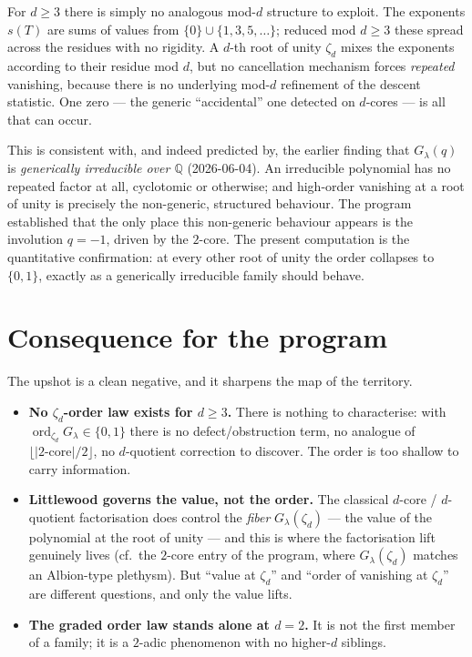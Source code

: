 \documentclass[11pt]{article}
\theoremstyle{definition}
\theoremstyle{remark}
\newcommand{\ord}{\operatorname{ord}}
\newcommand{\Q}{\mathbb{Q}}
\begin{document}
For $d \ge 3$ there is simply no analogous mod-$d$ structure to exploit. The exponents
$s(T)$ are sums of values from $\{0\} \cup \{1,3,5,\dots\}$; reduced mod $d \ge 3$
these spread across the residues with no rigidity. A $d$-th root of unity $\zeta_d$
mixes the exponents according to their residue mod $d$, but no cancellation mechanism
forces \emph{repeated} vanishing, because there is no underlying mod-$d$ refinement of
the descent statistic. One zero --- the generic ``accidental'' one detected on
$d$-cores --- is all that can occur.

This is consistent with, and indeed predicted by, the earlier finding that
$G_\lambda(q)$ is \emph{generically irreducible over $\Q$} (2026-06-04). An
irreducible polynomial has no repeated factor at all, cyclotomic or otherwise; and
high-order vanishing at a root of unity is precisely the non-generic, structured
behaviour. The program established that the only place this non-generic behaviour
appears is the involution $q = -1$, driven by the $2$-core. The present computation is
the quantitative confirmation: at every other root of unity the order collapses to
$\{0,1\}$, exactly as a generically irreducible family should behave.

\section{Consequence for the program}

The upshot is a clean negative, and it sharpens the map of the territory.

\begin{itemize}
\item \textbf{No $\zeta_d$-order law exists for $d \ge 3$.} There is nothing to
characterise: with $\ord_{\zeta_d} G_\lambda \in \{0,1\}$ there is no
defect/obstruction term, no analogue of $\lfloor |2\text{-core}|/2\rfloor$, no
$d$-quotient correction to discover. The order is too shallow to carry information.

\item \textbf{Littlewood governs the value, not the order.} The classical
$d$-core / $d$-quotient factorisation does control the \emph{fiber} $G_\lambda(\zeta_d)$
--- the value of the polynomial at the root of unity --- and this is where the
factorisation lift genuinely lives (cf.\ the $2$-core entry of the program, where
$G_\lambda(\zeta_d)$ matches an Albion-type plethysm). But ``value at $\zeta_d$'' and
``order of vanishing at $\zeta_d$'' are different questions, and only the value lifts.

\item \textbf{The graded order law stands alone at $d=2$.} It is not the first member
of a family; it is a $2$-adic phenomenon with no higher-$d$ siblings.
\end{itemize}
\end{document}
